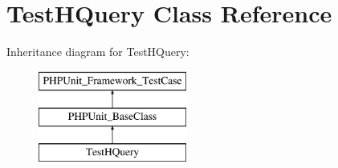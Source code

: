 \hypertarget{classTestHQuery}{}\section{Test\+H\+Query Class Reference}
\label{classTestHQuery}
Inheritance diagram for Test\+H\+Query\+:\begin{figure}[H]
\begin{center}
\leavevmode
\includegraphics[height=3.000000cm]{classTestHQuery}
\end{center}
\end{figure}
